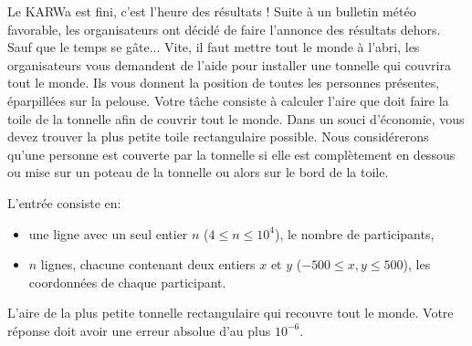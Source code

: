 \problemname{\problemyamlname}


\newcommand{\maxn}{10^4}

Le KARWa est fini, c'est l'heure des résultats ! Suite à un bulletin météo favorable, les organisateurs ont décidé de faire l'annonce des résultats dehors. Sauf que le temps se gâte... Vite, il faut mettre tout le monde à l'abri, les organisateurs vous demandent de l'aide pour installer une tonnelle qui couvrira tout le monde.
Ils vous donnent la position de toutes les personnes présentes, éparpillées sur la pelouse. Votre tâche consiste à calculer l'aire que doit faire la toile de la tonnelle afin de couvrir tout le monde. Dans un souci d'économie, vous devez trouver la plus petite toile rectangulaire possible.
Nous considérerons qu'une personne est couverte par la tonnelle si elle est complètement en dessous ou mise sur un poteau de la tonnelle ou alors sur le bord de la toile.

\begin{Input}
  L'entrée consiste en:
  \begin{itemize}
    \item une ligne avec un seul entier \(n\) (\(4 \leq n \leq \maxn\)), le nombre de participants,
    \item \(n\) lignes, chacune contenant deux entiers \(x\) et \(y\) (\(-500 \leq x, y \leq 500\)), les coordonnées de chaque participant.
  \end{itemize}
\end{Input}

\begin{Output}
  L'aire de la plus petite tonnelle rectangulaire qui recouvre tout le monde.
  Votre réponse doit avoir une erreur absolue d'au plus $10^{-6}$.
\end{Output}
